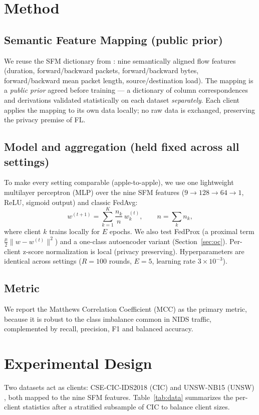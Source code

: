 \documentclass[11pt,a4paper]{article}
\begin{document}
\section{Method}
\subsection{Semantic Feature Mapping (public prior)}
We reuse the SFM dictionary from \cite{paper1}: nine semantically aligned flow
features (duration, forward/backward packets, forward/backward bytes,
forward/backward mean packet length, source/destination load). The mapping is a
\emph{public prior} agreed before training --- a dictionary of column
correspondences and derivations validated statistically on each dataset
\emph{separately}. Each client applies the mapping to its own data locally; no raw
data is exchanged, preserving the privacy premise of FL.

\subsection{Model and aggregation (held fixed across all settings)}
To make every setting comparable (apple-to-apple), we use one lightweight
multilayer perceptron (MLP) over the nine SFM features
(\(9\!\to\!128\!\to\!64\!\to\!1\), ReLU, sigmoid output) and classic FedAvg:
\begin{equation}
w^{(t+1)} = \sum_{k=1}^{K}\frac{n_k}{n}\,w_k^{(t)},\qquad n=\sum_k n_k,
\end{equation}
where client \(k\) trains locally for \(E\) epochs. We also test FedProx (a
proximal term \(\tfrac{\mu}{2}\lVert w-w^{(t)}\rVert^2\)) and a one-class
autoencoder variant (Section~\ref{sec:oc}). Per-client z-score normalization is
local (privacy preserving). Hyperparameters are identical across settings
(\(R=100\) rounds, \(E=5\), learning rate \(3\times10^{-3}\)).

\subsection{Metric}
We report the Matthews Correlation Coefficient (MCC) as the primary metric,
because it is robust to the class imbalance common in NIDS traffic, complemented
by recall, precision, F1 and balanced accuracy.

\section{Experimental Design}
Two datasets act as clients: CSE-CIC-IDS2018 (CIC) \cite{cicids} and UNSW-NB15
(UNSW) \cite{unsw}, both mapped to the nine SFM features. Table~\ref{tab:data} summarizes the per-client
statistics after a stratified subsample of CIC to balance client sizes.
\end{document}
